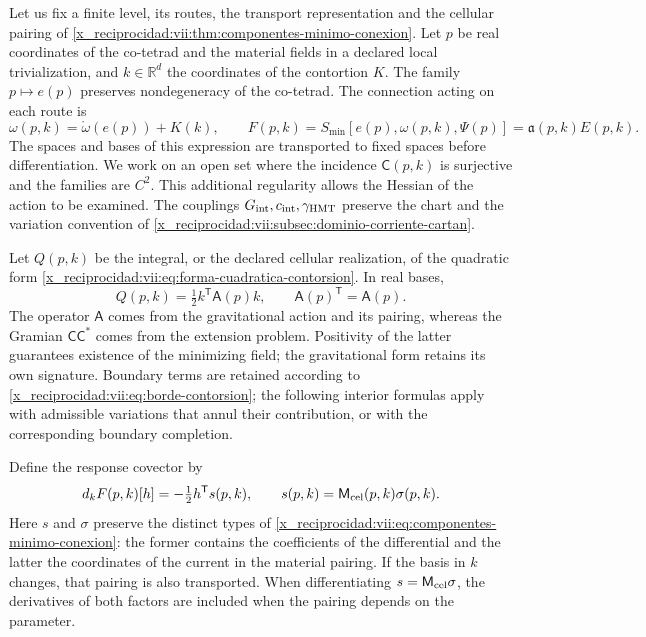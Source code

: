 Let us fix a finite level, its routes, the transport representation and
the cellular pairing of
\ref{x_reciprocidad:vii:thm:componentes-minimo-conexion}. Let \(p\) be real coordinates
of the co-tetrad and the material fields in a declared local
trivialization, and \(k\in\mathbb R^d\) the coordinates of the
contortion \(K\). The family \(p\mapsto e(p)\) preserves
nondegeneracy of the co-tetrad. The connection acting on each route is
\begin{equation}
 \omega(p,k)=\mathring\omega(e(p))+K(k),\qquad
 F(p,k)=S_{\min}[e(p),\omega(p,k),\Psi(p)]
       =\mathfrak a(p,k)E(p,k).
 \label{x_reciprocidad:vii:eq:accion-minima-en-contorsion}
\end{equation}
The spaces and bases of this expression are transported to fixed
spaces before differentiation. We work on an open set where the incidence
\(\mathsf C(p,k)\) is surjective and the families are \(C^2\).
This additional regularity allows the Hessian of the action to be examined.
The couplings \(G_{\rm int},c_{\rm int},\gamma_{\rm HMT}\)
preserve the chart and the variation convention of
\ref{x_reciprocidad:vii:subsec:dominio-corriente-cartan}.

Let \(Q(p,k)\) be the integral, or the declared cellular
realization, of the quadratic form
\eqref{x_reciprocidad:vii:eq:forma-cuadratica-contorsion}. In real bases,
\begin{equation}
 Q(p,k)=\tfrac12 k^{\mathsf T}\mathsf A(p)k,
 \qquad \mathsf A(p)^{\mathsf T}=\mathsf A(p).
 \label{x_reciprocidad:vii:eq:cuadratica-celular-contorsion}
\end{equation}
The operator \(\mathsf A\) comes from the gravitational action and
its pairing, whereas the Gramian
\(\mathsf C\mathsf C^*\) comes from the extension problem.
Positivity of the latter guarantees existence of the minimizing
field; the gravitational form retains its own signature.
Boundary terms are retained according to
\eqref{x_reciprocidad:vii:eq:borde-contorsion}; the following interior formulas
apply with admissible variations that annul their contribution, or
with the corresponding boundary completion.

Define the response covector by
\begin{equation}
 d_kF(p,k)[h]= -\tfrac12 h^{\mathsf T}s(p,k),
 \qquad s(p,k)=\mathsf M_{\rm cel}(p,k)\sigma(p,k).
 \label{x_reciprocidad:vii:eq:covector-torsional-minimo}
\end{equation}
Here \(s\) and \(\sigma\) preserve the distinct types of
\eqref{x_reciprocidad:vii:eq:componentes-minimo-conexion}: the former contains the
coefficients of the differential and the latter the coordinates of the
current in the material pairing. If the basis in
\(k\) changes, that pairing is also transported. When differentiating
\(s=\mathsf M_{\rm cel}\sigma\), the derivatives of
both factors are included when the pairing depends on the parameter.

